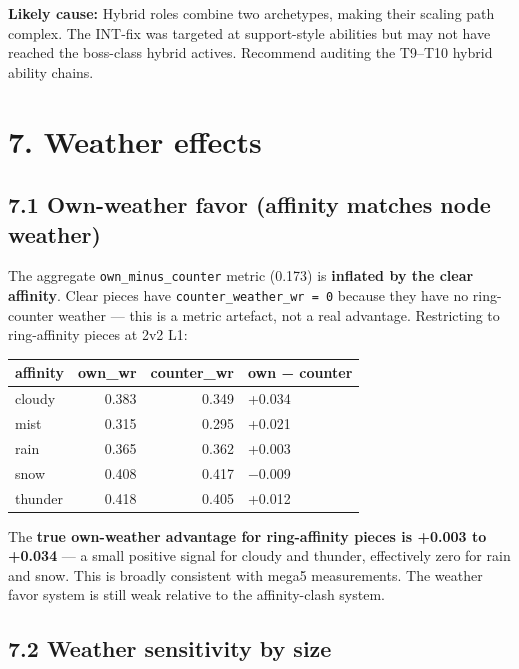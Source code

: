\documentclass[10pt]{article}
\begin{document}
\textbf{Likely cause:} Hybrid roles combine two archetypes, making their scaling path complex. The INT-fix was targeted at support-style abilities but may not have reached the boss-class hybrid actives. Recommend auditing the T9--T10 hybrid ability chains.\\


\section*{7. Weather effects}

\subsection*{7.1 Own-weather favor (affinity matches node weather)}

The aggregate \texttt{own\_\allowbreak{}minus\_\allowbreak{}counter} metric (0.173) is \textbf{inflated by the clear affinity}. Clear pieces have \texttt{counter\_\allowbreak{}weather\_\allowbreak{}wr = 0} because they have no ring-counter weather --- this is a metric artefact, not a real advantage. Restricting to ring-affinity pieces at 2v2 L1:\\

\medskip
\begin{tabularx}{\linewidth}{LrrL}
\toprule
\textbf{affinity} & \textbf{own\_wr} & \textbf{counter\_wr} & \textbf{own − counter} \\
\midrule
cloudy & 0.383 & 0.349 & +0.034 \\
mist & 0.315 & 0.295 & +0.021 \\
rain & 0.365 & 0.362 & +0.003 \\
snow & 0.408 & 0.417 & −0.009 \\
thunder & 0.418 & 0.405 & +0.012 \\
\bottomrule
\end{tabularx}
\medskip

The \textbf{true own-weather advantage for ring-affinity pieces is +0.003 to +0.034} --- a small positive signal for cloudy and thunder, effectively zero for rain and snow. This is broadly consistent with mega5 measurements. The weather favor system is still weak relative to the affinity-clash system.\\

\subsection*{7.2 Weather sensitivity by size}
\end{document}
